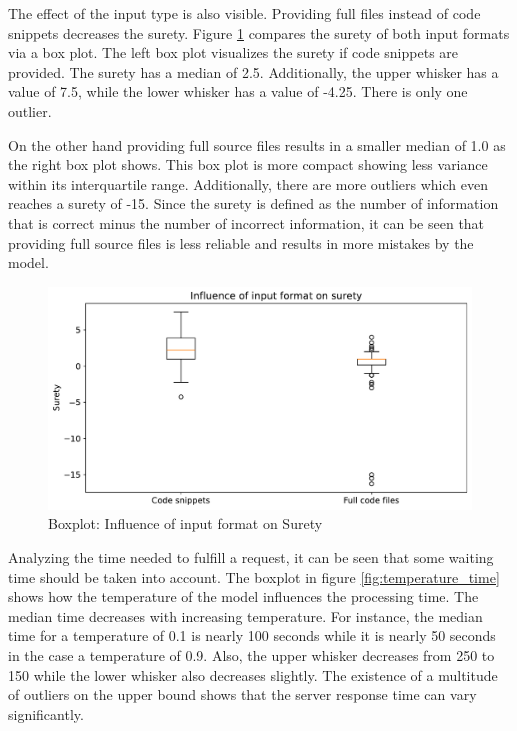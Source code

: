 The effect of the input type is also visible. Providing full files instead of code snippets decreases the surety.  Figure \ref{fig:detect_input_surety} compares the surety of both input formats via a box plot. The left box plot visualizes the surety if code snippets are provided. The surety has a median of 2.5. Additionally, the upper whisker has a value of 7.5, while the lower whisker has a value of -4.25. There is only one outlier.

On the other hand providing full source files results in a smaller median of 1.0 as the right box plot shows. This box plot is more compact showing less variance within its interquartile range.  Additionally, there are more outliers which even reaches a surety of -15.  Since the surety is defined as the number of information that is correct minus the number of incorrect information, it can be seen that providing full source files is less reliable and results in more mistakes by the model. 




\begin{figure}[ht!]
    \centering
    \includegraphics[width=\columnwidth]{figures/chapter5/detect_input_format_surety.pdf}
    \caption{Boxplot: Influence of input format on Surety}
    \label{fig:detect_input_surety}
\end{figure}

Analyzing the time needed to fulfill a request, it can be seen that some waiting time should be taken into account. The boxplot in figure \ref{fig:temperature_time} shows how the temperature of the model influences the processing time. The median time  decreases with increasing temperature. For instance, the median time for a temperature of 0.1 is nearly 100 seconds while it is nearly 50 seconds in the case a temperature of 0.9. Also, the upper whisker decreases from 250 to 150 while the lower whisker also decreases slightly. The existence of a multitude of outliers on the upper bound shows that the server response time can vary significantly. 

